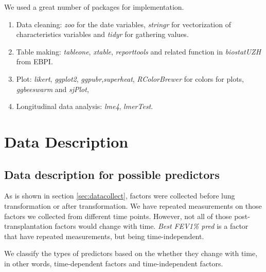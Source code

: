 \documentclass[11pt, a4paper]{article}\usepackage[]{graphicx}\usepackage[]{color}
\begin{document}
We used a great number of packages for implementation.

\begin{enumerate}
\item Data cleaning: \textit{zoo} for the date variables, \textit{stringr} for vectorization of characteristics variables and \textit{tidyr} for gathering values.


\item Table making: \textit{tableone}, \textit{xtable}, \textit{reporttools} and related function in \textit {biostatUZH} from EBPI.

\item Plot: \textit{likert}, \textit{ggplot2}, \textit{ggpubr},\textit{superheat}, \textit{RColorBrewer} for colors for plots, \textit{ggbeeswarm} and \textit{sjPlot}, 

\item Longitudinal data analysis: \textit{lme4}, \textit{lmerTest}.

\end{enumerate}

\clearpage


\vspace{2cm}
\section{Data Description} \label{sec:Description}
\subsection*{Data description for possible predictors} \label{subsec:factors}
As is shown in section \ref{sec:datacollect}, factors were collected before lung transformation or after transformation. We have repeated measurements on those factors we collected from different time points. However, not all of those post-transplantation factors would change with time. \textit{Best FEV1\% pred} is a factor that have repeated measurements, but being time-independent.

We classify the types of predictors based on the whether they change with time, in other words, time-dependent factors and time-independent factors.

\vspace{1cm}
\end{document}
